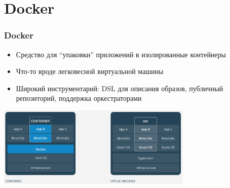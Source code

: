 \documentclass{../../slides-style}
\begin{document}
    \begin{frame}[plain]
        \titlepage
    \end{frame}

    \section{Docker}

    \begin{frame}
        \frametitle{Docker}
        \begin{itemize}
            \item Средство для ``упаковки'' приложений в изолированные контейнеры
            \item Что-то вроде легковесной виртуальной машины
            \item Широкий инструментарий: DSL для описания образов, публичный репозиторий, поддержка оркестраторами
        \end{itemize}
        \begin{center}
            \includegraphics[width=0.7\textwidth]{docker.png}
        \end{center}
    \end{frame}
\end{document}
